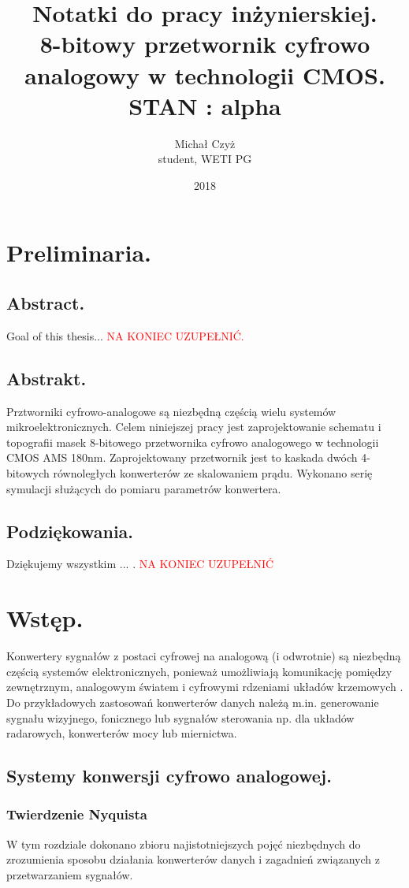 \documentclass[10pt,a4paper]{report}
\title{Notatki do pracy inżynierskiej. \\ 8-bitowy przetwornik cyfrowo analogowy w technologii CMOS. \\ STAN : alpha}
\date{2018}
\author{Michał Czyż \\ student, WETI PG}
\theoremstyle{definition}
\theoremstyle{definition}
\theoremstyle{definition}
\theoremstyle{definition}
\theoremstyle{definition}
\begin{document}
	\maketitle
	
	\tableofcontents
	\newpage
	\chapter{Preliminaria.}
	\section{Abstract.}
	{	Goal of this thesis... \textcolor{red}{NA KONIEC UZUPEŁNIĆ.} }

	\section{Abstrakt.}
	{	Prztworniki cyfrowo-analogowe są niezbędną częścią wielu systemów mikroelektronicznych. Celem niniejszej pracy jest zaprojektowanie schematu i topografii masek 8-bitowego przetwornika cyfrowo analogowego w technologii CMOS AMS 180nm. Zaprojektowany przetwornik jest to kaskada dwóch 4-bitowych równoległych konwerterów ze skalowaniem prądu. Wykonano serię symulacji służących do pomiaru parametrów konwertera.}
	
	\section{Podziękowania.}
	{	Dziękujemy wszystkim ... . \textcolor{red}{NA KONIEC UZUPEŁNIĆ} }
	
	\chapter{Wstęp.}
	{	Konwertery sygnałów z postaci cyfrowej na analogową (i odwrotnie) są niezbędną częścią systemów elektronicznych, ponieważ umożliwiają komunikację pomiędzy zewnętrznym, analogowym światem i cyfrowymi rdzeniami układów krzemowych \cite{integconv}. Do przykładowych zastosowań konwerterów danych należą m.in. generowanie sygnału wizyjnego, fonicznego lub sygnałów sterowania np. dla układów radarowych, konwerterów mocy lub miernictwa. }
	

	\section{Systemy konwersji cyfrowo analogowej.}
	\subsection{Twierdzenie Nyquista}
	{	W tym rozdziale dokonano zbioru najistotniejszych pojęć niezbędnych do zrozumienia sposobu działania konwerterów danych i zagadnień związanych z przetwarzaniem sygnałów. }
	
\end{document}
